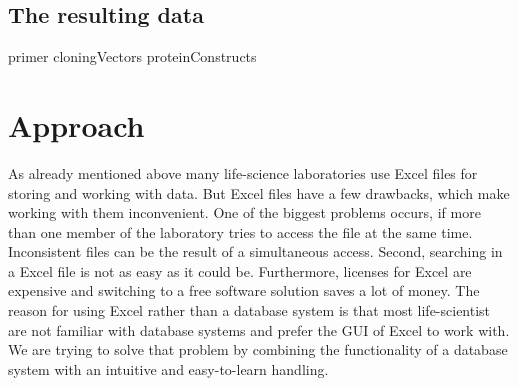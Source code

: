 \documentclass{bioinfo}
\begin{document}
\subsection{The resulting data}
primer
cloningVectors
proteinConstructs


\section{Approach}

As already mentioned above many life-science laboratories use Excel files for storing and working with 
data. But Excel files have a few drawbacks, which make working with them inconvenient. One of the 
biggest problems occurs, if more than one member of the laboratory tries to access the file at the 
same time. Inconsistent files can be the result of a simultaneous access. Second, searching in a Excel file is not as easy as 
it could be. Furthermore, licenses for Excel are expensive and switching to a free software solution 
saves a lot of money. The reason for using Excel rather than a database system is that most life-scientist 
are not familiar with database systems and prefer the GUI of Excel to work with. We are 
trying to solve that problem by combining the functionality of a database system with an intuitive and 
easy-to-learn handling.
\end{document}
